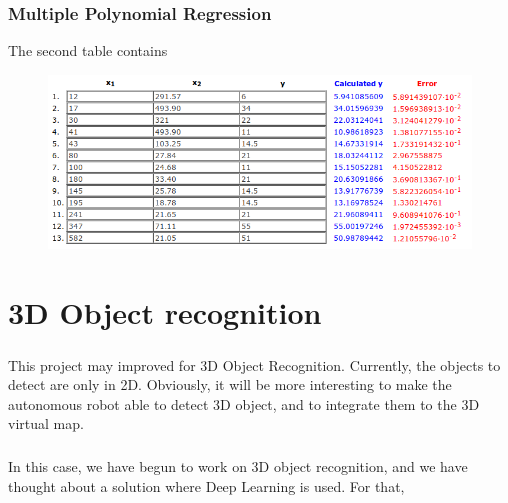 \documentclass[12pt]{report}
\begin{document}
\subsection{Multiple Polynomial Regression}
The second table contains 
\begin{figure}[H]
	\begin{center}
		\includegraphics[scale=0.6]{res/reg3D.png}
	\end{center}
\end{figure} 
	\chapter{3D Object recognition}

	\paragraph{}
	This project may improved for 3D Object Recognition. Currently, the objects to detect are only in 2D. Obviously, it will be more interesting to make the autonomous robot able to detect 3D object, and to integrate them to the 3D virtual map.  
	
	\paragraph{}
	In this case, we have begun to work on 3D object recognition, and we have thought about a solution where Deep Learning is used. For that, 
\end{document}
